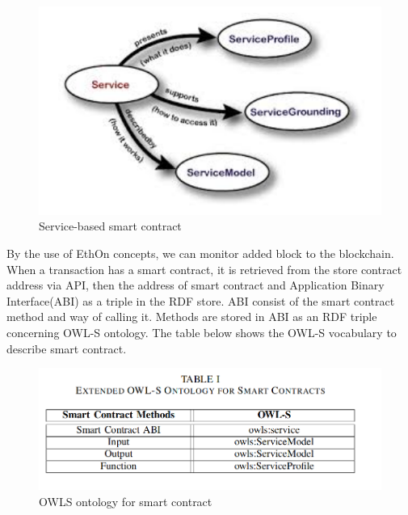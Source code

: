 \begin{center}
	\begin{figure}[htb!]
		
		\begin{minipage}{0.55\linewidth}
			\centering
			\includegraphics[width=1.55\textwidth]{images/chap02_SmartContract.png}
		\end{minipage}
		\caption[Service-based smart contract]{Service-based smart contract}
		
	\end{figure}
	
\end{center}
By the use of EthOn concepts, we can monitor added block to the blockchain. When a transaction has a smart contract, it is retrieved from the store contract address via API, then the address of smart contract and Application Binary Interface(ABI) as a triple in the RDF store. ABI consist of the smart contract method and way of calling it. Methods are stored in ABI as an RDF triple concerning OWL-S ontology. The table below shows the OWL-S vocabulary to describe smart contract\cite{Baqa}.
\begin{center}
	\begin{figure}[htb!]
		
		\begin{minipage}{0.55\linewidth}
			\centering
			\includegraphics[width=1.95\textwidth]{images/chap02_OWL.png}
		\end{minipage}
		\caption[OWLS ]{OWLS ontology for smart contract} 
		
	\end{figure}
	
\end{center}
